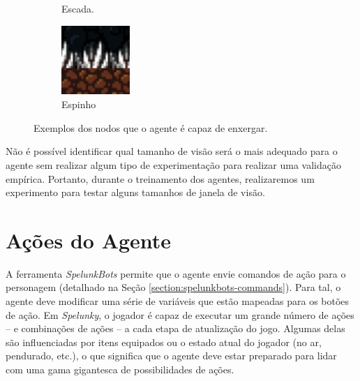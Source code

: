 \begin{figure}[H]
\begin{subfigure}[b]{0.15\textwidth}
		\caption{Escada.}
	\end{subfigure}
	\begin{subfigure}[b]{0.15\textwidth}
        \includegraphics[width=\textwidth]{fig/spelunky-spike.pdf}
		\caption{Espinho}
	\end{subfigure}
	\caption{Exemplos dos nodos que o agente é capaz de enxergar.}
	\label{fig:vision-nodes}
\end{figure}

Não é possível identificar qual tamanho de visão será o mais adequado para o
agente sem realizar algum tipo de experimentação para realizar uma validação
empírica. Portanto, durante o treinamento dos agentes, realizaremos um
experimento para testar alguns tamanhos de janela de visão.


\section{\label{section:modelling-outputs}Ações do Agente}
A ferramenta \textit{SpelunkBots} permite que o agente envie comandos de ação
para o personagem (detalhado na Seção \ref{section:spelunkbots-commands}). Para
tal, o agente deve modificar uma série de variáveis que estão mapeadas para os
botões de ação. Em \textit{Spelunky}, o jogador é capaz de executar um grande
número de ações -- e combinações de ações -- a cada etapa de atualização do
jogo. Algumas delas são influenciadas por itens equipados ou o estado atual do
jogador (no ar, pendurado, etc.), o que significa que o agente deve estar
preparado para lidar com uma gama gigantesca de possibilidades de ações.

